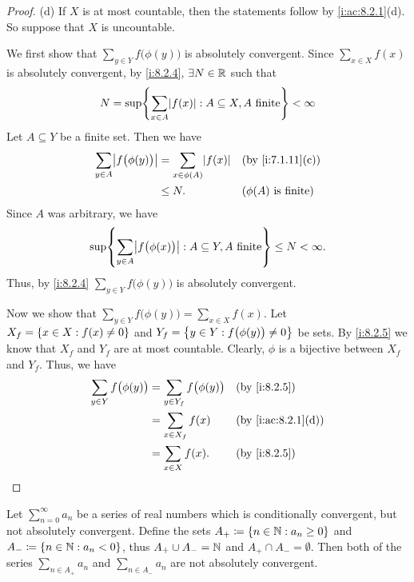 \begin{proof}{(d)}
  If \(X\) is at most countable, then the statements follow by \cref{i:ac:8.2.1}(d).
  So suppose that \(X\) is uncountable.

  We first show that \(\sum_{y \in Y} f\big(\phi(y)\big)\) is absolutely convergent.
  Since \(\sum_{x \in X} f(x)\) is absolutely convergent, by \cref{i:8.2.4}, \(\exists N \in \mathbb{R}\) such that
  \[
    N = \sup\set{\sum_{x \in A} \abs{f(x)} : A \subseteq X, A \text{ finite}} < \infty
  \]
  Let \(A \subseteq Y\) be a finite set.
  Then we have
  \begin{align*}
    \sum_{y \in A} \abs{f\big(\phi(y)\big)} & = \sum_{x \in \phi(A)} \abs{f(x)} &  & \by{i:7.1.11}[c]               \\
                                            & \leq N.                           &  & \text{(\(\phi(A)\) is finite)}
  \end{align*}
  Since \(A\) was arbitrary, we have
  \[
    \sup\set{\sum_{y \in A} \abs{f\big(\phi(x)\big)} : A \subseteq Y, A \text{ finite}} \leq N < \infty.
  \]
  Thus, by \cref{i:8.2.4} \(\sum_{y \in Y} f\big(\phi(y)\big)\) is absolutely convergent.

  Now we show that \(\sum_{y \in Y} f\big(\phi(y)\big) = \sum_{x \in X} f(x)\).
  Let \(X_f = \left\lbrace x \in X : f(x) \neq 0\right\rbrace\) and \(Y_f = \left\lbrace y \in Y : f\big(\phi(y)\big) \neq 0\right\rbrace\) be sets.
  By \cref{i:8.2.5} we know that \(X_f\) and \(Y_f\) are at most countable.
  Clearly, \(\phi\) is a bijective between \(X_f\) and \(Y_f\).
  Thus, we have
  \begin{align*}
    \sum_{y \in Y} f\big(\phi(y)\big) & = \sum_{y \in Y_f} f\big(\phi(y)\big) &  & \by{i:8.2.5}       \\
                                      & = \sum_{x \in X_f} f(x)               &  & \by{i:ac:8.2.1}[d] \\
                                      & = \sum_{x \in X} f(x).                &  & \by{i:8.2.5}
  \end{align*}
\end{proof}

\begin{lem}\label{i:8.2.7}
  Let \(\sum_{n = 0}^\infty a_n\) be a series of real numbers which is conditionally convergent, but not absolutely convergent.
  Define the sets \(A_+ \coloneqq \left\lbrace n \in \mathbb{N} : a_n \geq 0\right\rbrace\) and \(A_- \coloneqq \left\lbrace n \in \mathbb{N} : a_n < 0\right\rbrace\), thus \(A_+ \cup A_- = \mathbb{N}\) and \(A_+ \cap A_- = \emptyset\).
  Then both of the series \(\sum_{n \in A_+} a_n\) and \(\sum_{n \in A_-} a_n\) are not absolutely convergent.
\end{lem}


